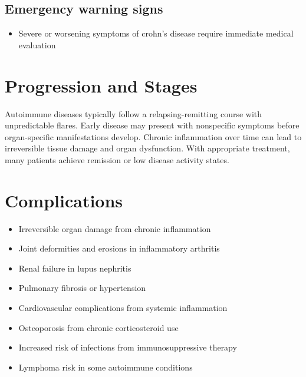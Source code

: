\subsection{Emergency warning signs}
\begin{itemize}[noitemsep]
  \item Severe or worsening symptoms of crohn's disease require immediate medical evaluation
\end{itemize}
\section{Progression and Stages}
Autoimmune diseases typically follow a relapsing-remitting course with unpredictable flares. Early disease may present with nonspecific symptoms before organ-specific manifestations develop. Chronic inflammation over time can lead to irreversible tissue damage and organ dysfunction. With appropriate treatment, many patients achieve remission or low disease activity states.
\section{Complications}
\begin{itemize}[noitemsep]
  \item Irreversible organ damage from chronic inflammation
  \item Joint deformities and erosions in inflammatory arthritis
  \item Renal failure in lupus nephritis
  \item Pulmonary fibrosis or hypertension
  \item Cardiovascular complications from systemic inflammation
  \item Osteoporosis from chronic corticosteroid use
  \item Increased risk of infections from immunosuppressive therapy
  \item Lymphoma risk in some autoimmune conditions
\end{itemize}
